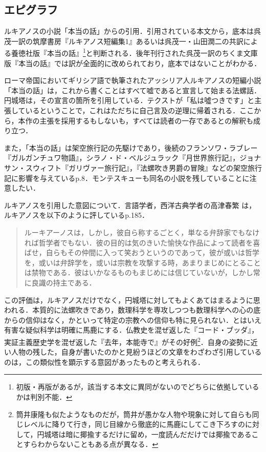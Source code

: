 \documentclass[10pt, a5paper, twoside]{ltjsarticle}
\begin{document}
        \subsection{エピグラフ}

            ルキアノスの小説「本当の話」からの引用．引用されている本文から，底本は呉茂一訳の筑摩書房『ルキアノス短編集1』\cite{kure1}あるいは呉茂一・山田潤二の共訳による養徳社版『本当の話』\cite{kureyamada}\footnote{初版・再版があるが，該当する本文に異同がないのでどちらに依拠しているかは判別不能．}と判断される．後年刊行された呉茂一訳のちくま文庫版『本当の話』\cite{kure2}では訳が全面的に改められており，底本ではないことがわかる．

            ローマ帝国においてギリシア語で執筆されたアッシリア人ルキアノスの短編小説「本当の話」は，これから書くことはすべて嘘であると宣言して始まる法螺話．円城塔は，その宣言の箇所を引用している．テクストが「私は噓つきです」と主張しているということで，これはただちに自己言及の逆理に帰着される．ここから，本作の主張を採用するもしないも，すべては読者の一存であるとの解釈も成り立つ．

            また，「本当の話」は架空旅行記の先駆けであり，後続のフランソワ・ラブレー『ガルガンチュワ物語』，シラノ・ド・ベルジュラック『月世界旅行記』，ジョナサン・スウィフト『ガリヴァー旅行記』，『法螺吹き男爵の冒険』などの架空旅行記に影響を与えている\cite{kure2}p.8．モンテスキューも同名の小説\cite{montesquieu}を残していることに注意したい．

            ルキアノスを引用した意図について．言語学者，西洋古典学者の高津春繁%
            は，ルキアノスを以下のように評している\cite{koudu}p.185．

            \begin{quote}
                ルーキアーノスは，しかし，彼自ら称するごとく，単なる弁辞家でもなければ哲学者でもない．彼の目的は気のきいた愉快な作品によって読者を喜ばせ，自らもその仲間に入って笑おうというのであって，彼が或いは哲学を，或いは弁辞学を，或いは宗教を攻撃する時，あまりまじめにとることは禁物である．彼はいかなるものもまじめには信じていないが，しかし常に良識の持主である．
            \end{quote}

            この評価は，ルキアノスだけでなく，円城塔に対してもよくあてはまるように思われる．本質的に法螺吹きであり，数理科学を専攻しつつも数理科学への心の底からの信仰はなく，かといって特定の宗教への信仰も特に見られない．とはいえ有害な疑似科学は明確に馬鹿にする．仏教史を混ぜ返した『コード・ブッダ』，実証主義歴史学を混ぜ返した『去年，本能寺で』がその好例\footnote{筒井康隆も似たようなものだが，筒井が愚かな人物や現象に対して自らも同じレベルに降りて行き，同じ目線から徹底的に馬鹿にしてこき下ろすのに対して，円城塔は暗に揶揄するだけに留め，一度読んだだけでは揶揄であることすらわからないこともある点が異なる．}．自身の姿勢に近い人物の残した，自身が書いたのかと見紛うほどの文章をわざわざ引用しているのは，この類似性を顕示する意図があったものと考えられる．
\end{document}
